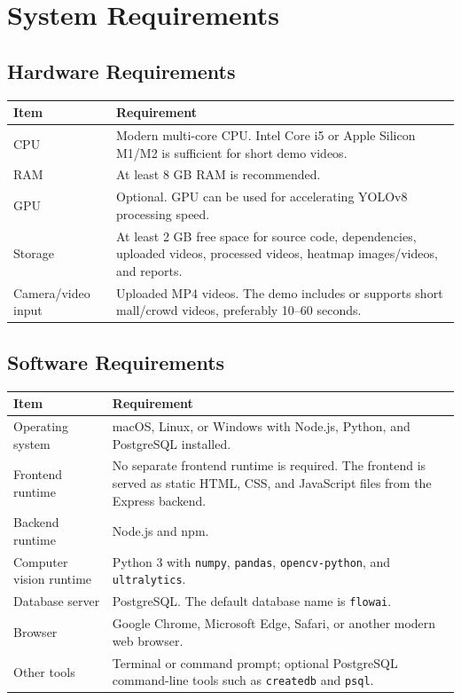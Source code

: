 \documentclass[12pt,a4paper]{report}
\begin{document}
\section{System Requirements}

\subsection{Hardware Requirements}

\begin{longtable}{|p{5cm}|p{9cm}|}
\hline
\rowcolor{HeaderBlue}
\textbf{Item} & \textbf{Requirement} \\
\hline
CPU & Modern multi-core CPU. Intel Core i5 or Apple Silicon M1/M2 is sufficient for short demo videos. \\
\hline
RAM & At least 8 GB RAM is recommended. \\
\hline
GPU & Optional. GPU can be used for accelerating YOLOv8 processing speed. \\
\hline
Storage & At least 2 GB free space for source code, dependencies, uploaded videos, processed videos, heatmap images/videos, and reports. \\
\hline
Camera/video input & Uploaded MP4 videos. The demo includes or supports short mall/crowd videos, preferably 10--60 seconds. \\
\hline
\end{longtable}

\subsection{Software Requirements}

\begin{longtable}{|p{5cm}|p{9cm}|}
\hline
\rowcolor{HeaderBlue}
\textbf{Item} & \textbf{Requirement} \\
\hline
Operating system & macOS, Linux, or Windows with Node.js, Python, and PostgreSQL installed. \\
\hline
Frontend runtime & No separate frontend runtime is required. The frontend is served as static HTML, CSS, and JavaScript files from the Express backend. \\
\hline
Backend runtime & Node.js and npm. \\
\hline
Computer vision runtime & Python 3 with \texttt{numpy}, \texttt{pandas}, \texttt{opencv-python}, and \texttt{ultralytics}. \\
\hline
Database server & PostgreSQL. The default database name is \texttt{flowai}. \\
\hline
Browser & Google Chrome, Microsoft Edge, Safari, or another modern web browser. \\
\hline
Other tools & Terminal or command prompt; optional PostgreSQL command-line tools such as \texttt{createdb} and \texttt{psql}. \\
\hline
\end{longtable}
\end{document}
